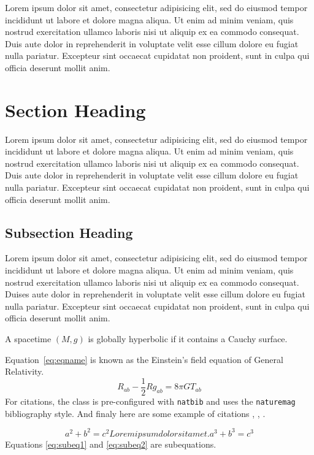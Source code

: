 \documentclass[11pt]{penrose}
\begin{document}
Lorem ipsum dolor sit amet, consectetur adipisicing elit, sed do eiusmod tempor incididunt ut labore et dolore magna aliqua. Ut enim ad minim veniam, quis nostrud exercitation ullamco laboris nisi ut aliquip ex ea commodo consequat. Duis aute dolor in reprehenderit in voluptate velit esse cillum dolore eu fugiat nulla pariatur. Excepteur sint occaecat cupidatat non proident, sunt in culpa qui officia deserunt mollit anim.

\section{Section Heading}
Lorem ipsum dolor sit amet, consectetur adipisicing elit, sed do eiusmod tempor incididunt ut labore et dolore magna aliqua. Ut enim ad minim veniam, quis nostrud exercitation ullamco laboris nisi ut aliquip ex ea commodo consequat. Duis aute dolor in reprehenderit in voluptate velit esse cillum dolore eu fugiat nulla pariatur. Excepteur sint occaecat cupidatat non proident, sunt in culpa qui officia deserunt mollit anim.

\subsection{Subsection Heading}
Lorem ipsum dolor sit amet, consectetur adipisicing elit, sed do eiusmod tempor incididunt ut labore et dolore magna aliqua. Ut enim ad minim veniam, quis nostrud exercitation ullamco laboris nisi ut aliquip ex ea commodo consequat. Duises aute dolor in reprehenderit in voluptate velit esse cillum dolore eu fugiat nulla pariatur. Excepteur sint occaecat cupidatat non proident, sunt in culpa qui officia deserunt mollit anim.

\begin{nthm}
    A spacetime $(M, g)$ is globally hyperbolic if it contains a Cauchy surface.
\end{nthm}

Equation~\eqref{eq:eqname} is known as the Einstein's field equation of General Relativity.
\begin{equation}
    R_{ab} - \frac{1}{2}R g_{ab} = 8\pi G T_{ab}
    \label{eq:eqname}
\end{equation}
For citations, the class is pre-configured with \texttt{natbib} and uses the \texttt{naturemag} bibliography style. And finaly here are some example of citations \cite{CitekeyArticle}, \citep{CitekeyBook}, \cite[page -1]{CitekeyArticle}.

\begin{subequations}
  \begin{equation}
    a^{2} + b^{2} = c^{2}
    \label{eq:subeq1}
  \end{equation}
  Lorem ipsum dolor sit amet.
  \begin{equation}
    a^{3} + b^{3} = c^{3}
    \label{eq:subeq2}
  \end{equation}
\end{subequations}
Equations \eqref{eq:subeq1} and \eqref{eq:subeq2} are subequations.
\end{document}

